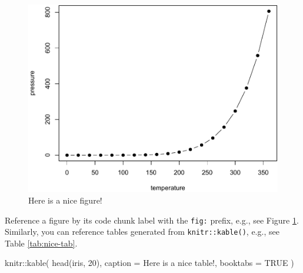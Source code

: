 \documentclass[
  12pt,
]{book}
\newenvironment{Shaded}{\begin{snugshade}}{\end{snugshade}}
\newcommand{\AttributeTok}[1]{\textcolor[rgb]{0.77,0.63,0.00}{#1}}
\newcommand{\ConstantTok}[1]{\textcolor[rgb]{0.00,0.00,0.00}{#1}}
\newcommand{\DecValTok}[1]{\textcolor[rgb]{0.00,0.00,0.81}{#1}}
\newcommand{\FunctionTok}[1]{\textcolor[rgb]{0.00,0.00,0.00}{#1}}
\newcommand{\NormalTok}[1]{#1}
\newcommand{\SpecialCharTok}[1]{\textcolor[rgb]{0.00,0.00,0.00}{#1}}
\newcommand{\StringTok}[1]{\textcolor[rgb]{0.31,0.60,0.02}{#1}}
\begin{document}
\begin{figure}

{\centering \includegraphics[width=0.8\linewidth]{bookdown-demo_files/figure-latex/nice-fig-1} 

}

\caption{Here is a nice figure!}\label{fig:nice-fig}
\end{figure}

Reference a figure by its code chunk label with the \texttt{fig:} prefix, e.g., see Figure \ref{fig:nice-fig}. Similarly, you can reference tables generated from \texttt{knitr::kable()}, e.g., see Table \ref{tab:nice-tab}.

\begin{Shaded}
\begin{Highlighting}[]
\NormalTok{knitr}\SpecialCharTok{::}\FunctionTok{kable}\NormalTok{(}
  \FunctionTok{head}\NormalTok{(iris, }\DecValTok{20}\NormalTok{), }\AttributeTok{caption =} \StringTok{\textquotesingle{}Here is a nice table!\textquotesingle{}}\NormalTok{,}
  \AttributeTok{booktabs =} \ConstantTok{TRUE}
\NormalTok{)}
\end{Highlighting}
\end{Shaded}
\end{document}

